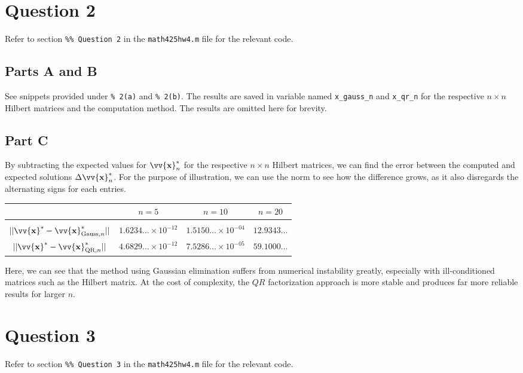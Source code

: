 \documentclass[12pt]{article}
\newcommand{\vect}[1]{\vv{\mathbf{#1}}}
\newcommand{\code}[1]{\texttt{#1}}
\begin{document}
\section*{Question 2}

Refer to section \code{\%\% Question 2} in the \code{math425hw4.m} file for the relevant code.

\subsection*{Parts A and B}

See snippets provided under \code{\% 2(a)} and \code{\% 2(b)}. The results are saved in variable named \verb|x_gauss_n| and \verb|x_qr_n| for the respective $n\times n$ Hilbert matrices and the computation method. The results are omitted here for brevity.

\subsection*{Part C}

By subtracting the expected values for $\vect{x}^*_n$ for the respective $n\times n$ Hilbert matrices, we can find the error between the computed and expected solutions $\Delta\vect{x}^*_n$. For the purpose of illustration, we can use the norm to see how the difference grows, as it also disregards the alternating signs for each entries.

\begin{table}[H]
    \centering
    \begin{tabular}{cccc}
         & $n=5$ & $n=10$ & $n=20$ \\
        \hline \\
       $||\vect{x}^* - \vect{x}^*_{\text{Gauss}, n}||$  & $1.6234\ldots\times10^{-12}$ & $1.5150\ldots\times10^{-04}$ & $12.9343\ldots$\\
       $||\vect{x}^* - \vect{x}^*_{\text{QR}, n}||$ & $4.6829\ldots\times10^{-12}$ & $7.5286\ldots\times10^{-05}$ & $59.1000\ldots$ \\
    \end{tabular}
\end{table}

Here, we can see that the method using Gaussian elimination suffers from numerical instability greatly, especially with ill-conditioned matrices such as the Hilbert matrix. At the cost of complexity, the $QR$ factorization approach is more stable and produces far more reliable results for larger $n$.

\section*{Question 3}

Refer to section \code{\%\% Question 3} in the \code{math425hw4.m} file for the relevant code.
\end{document}
